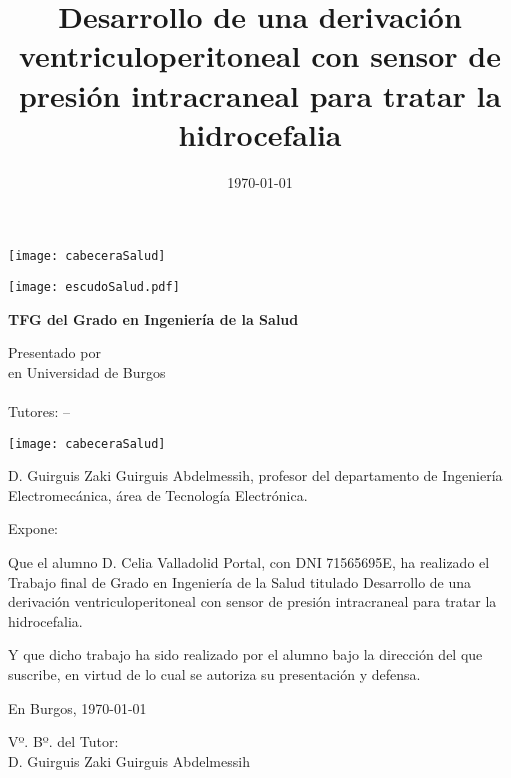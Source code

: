 \documentclass[a4paper,12pt,twoside]{memoir}
\title{Desarrollo de una derivación ventriculoperitoneal con sensor de presión intracraneal para tratar la hidrocefalia}
\author{\nombre}
\date{\today}
\makeatletter
\def\maketitle{
  \null
  \thispagestyle{empty}
\begin{center}
  \noindent\texttt{[image: cabeceraSalud]}\vspace{1.5cm}%
\end{center}
  
  \begin{center}
    \begin{minipage}[c][1.5cm][c]{.20\textwidth}
        \texttt{[image: escudoSalud.pdf]}
    \end{minipage}
  \end{center}
  
  \begin{center}
    \colorbox{cpardoBox}{%
        \begin{minipage}{.8\textwidth}
          \vspace{.5cm}\Large
          \begin{center}
          \textbf{TFG del Grado en Ingeniería de la Salud}\vspace{.6cm}\\
          \textbf{\LARGE\@title{}}
          \end{center}
          \vspace{.2cm}
        \end{minipage}
    }%
  \end{center}
  
  \begin{center}%
  {%
    \noindent\LARGE
    Presentado por \@author{}\\ 
    en Universidad de Burgos\\
    \vspace{0.5cm}
    \noindent\Large
    \@date{}\\
    \vspace{0.5cm}
    Tutores: \@tutor{} -- \@tutorb{}\\
  }%
  \end{center}%
  \null
  \cleardoublepage
  }
\newcommand{\nombre}{Celia Valladolid Portal}
\newcommand{\nombreTutor}{Guirguis Zaki Guirguis Abdelmessih}
\newcommand{\dni}{71565695E}
\makeatother
\begin{document}
\maketitle


\newpage\null\thispagestyle{empty}\newpage

\thispagestyle{empty}


\noindent\texttt{[image: cabeceraSalud]}\vspace{1cm}

\noindent D. \nombreTutor, profesor del departamento de Ingeniería Electromecánica, área de Tecnología Electrónica.

\noindent Expone:

\noindent Que el alumno D. \nombre, con DNI \dni, ha realizado el Trabajo final de Grado en Ingeniería de la Salud titulado Desarrollo de una derivación ventriculoperitoneal con sensor de presión intracraneal para tratar la hidrocefalia. 

\noindent Y que dicho trabajo ha sido realizado por el alumno bajo la dirección del que suscribe, en virtud de lo cual se autoriza su presentación y defensa.

\begin{center} %
En Burgos, {\large \today}
\end{center}

\vfill\vfill\vfill

\begin{minipage}{0.45\textwidth}
\begin{flushleft} %
Vº. Bº. del Tutor:\\[2cm]
D. \nombreTutor
\end{flushleft}
\end{minipage}
\hfill
\begin{minipage}{0.45\textwidth}
\begin{flushleft} %
\end{flushleft}
\end{minipage}
\hfill

\vfill



\newpage\null\thispagestyle{empty}\newpage
\end{document}

